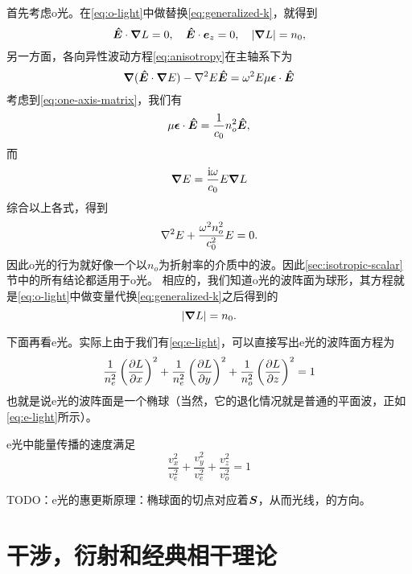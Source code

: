 首先考虑o光。在\eqref{eq:o-light}中做替换\eqref{eq:generalized-k}，就得到
\[
    \vu*{E} \cdot \grad{L} = 0, \quad \vu*{E} \cdot \vb*{e}_z = 0, \quad \abs{\grad{L}} = n_0,
\]
另一方面，各向异性波动方程\eqref{eq:anisotropy}在主轴系下为
\[
    \grad{(\vu*{E} \cdot \grad{E})} - \laplacian E \vu*{E} = \omega^2 E \mu \vb*{\epsilon} \cdot \vu*{E}
\]
考虑到\eqref{eq:one-axis-matrix}，我们有
\[
    \mu \vb*{\epsilon} \cdot \vu*{E} = \frac{1}{c_0} n_o^2 \vu*{E},
\]
而
\[
    \grad{E} = \frac{\mathrm{i} \omega}{c_0} E \grad{L}
\]
综合以上各式，得到
\begin{equation}
    \laplacian E + \frac{\omega^2 n_o^2}{c_0^2} E = 0.
    \label{eq:o-light-wave-eq}
\end{equation}
因此o光的行为就好像一个以$n_o$为折射率的介质中的波。因此\ref{sec:isotropic-scalar}节中的所有结论都适用于o光。
相应的，我们知道o光的波阵面为球形，其方程就是\eqref{eq:o-light}中做变量代换\eqref{eq:generalized-k}之后得到的
\begin{equation}
    \abs{\grad{L}} = n_0.
\end{equation}

下面再看e光。实际上由于我们有\eqref{eq:e-light}，可以直接写出e光的波阵面方程为
\begin{equation}
    \frac{1}{n_e^2} \left( \pdv{L}{x} \right)^2 + \frac{1}{n_e^2} \left( \pdv{L}{y} \right)^2 + \frac{1}{n_o^2} \left( \pdv{L}{z} \right)^2 = 1
\end{equation}
也就是说e光的波阵面是一个椭球（当然，它的退化情况就是普通的平面波，正如\eqref{eq:e-light}所示）。

e光中能量传播的速度满足
\begin{equation}
    \frac{v_x^2}{v_e^2} + \frac{v_y^2}{v_e^2} + \frac{v_z^2}{v_o^2} = 1
\end{equation}

TODO：e光的惠更斯原理：椭球面的切点对应着$\vb*{S}$，从而光线，的方向。

\chapter{干涉，衍射和经典相干理论}

